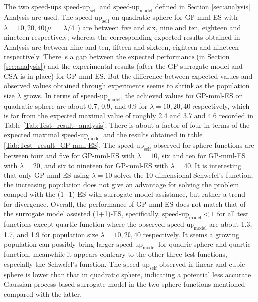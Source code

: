 The two speed-ups $\text{speed-up}_{\text{self}}$ and $\text{speed-up}_{\text{model}}$ defined in Section \ref{sec:analysis} Analysis are used.  The $\text{speed-up}_{\text{self}}$ on quadratic sphere for GP-mml-ES with $\lambda=10,20,40$($\mu = \lceil \lambda/4 \rceil $) are between five and six, nine and ten, eighteen and nineteen respectively; whereas the corresponding expected results obtained in Analysis are between nine and ten, fifteen and sixteen, eighteen and nineteen respectively. There is a gap between the expected performance (in Section \ref{sec:analysis}) and the experimental results (after the GP surrogate model and CSA is in place) for GP-mml-ES. But the difference between expected values and observed values obtained through experiments seems to shrink as the population size $\lambda$ grows. In terms of $\text{speed-up}_{\text{model}}$, the achieved values for GP-mml-ES on quadratic sphere are about 0.7, 0.9, and 0.9 for $\lambda=10,20,40$ respectively, which is far from the expected maximal value of roughly 2.4 and 3.7 and 4.6 recorded in Table \ref{Tab:Test_result_analysis}. There is about a factor of four in terms of the expected maximal $\text{speed-up}_{\text{model}}$ and the results obtained in table \ref{Tab:Test_result_GP-mml-ES}. The $\text{speed-up}_{\text{self}}$ observed for sphere functions are between four and five for GP-mml-ES with $\lambda=10$, six and ten for GP-mml-ES with $\lambda=20$, and six to nineteen for GP-mml-ES with $\lambda=40$. It is interesting that only GP-mml-ES using $\lambda=10$ solves the 10-dimensional Schwefel's function, the increasing population does not give an advantage for solving the problem comped with the (1+1)-ES with surrogate model assistance, but rather a trend for divergence. Overall, the performance of GP-mml-ES does not match that of the surrogate model assisted (1+1)-ES, specifically, $\text{speed-up}_{\text{model}}<1$ for all test functions except quartic function where the observed $\text{speed-up}_{\text{model}}$ are about 1.3, 1.7, and 1.9 for population size $\lambda=10,20,40$ respectively. It seems a growing population can possibly bring larger $\text{speed-up}_{\text{model}}$ for quadric sphere and quartic function, meanwhile it appears contrary to the other three test functions, especially the Schwefel's function. The $\text{speed-up}_{\text{self}}$ observed in linear and cubic sphere is lower than that in quadratic sphere, indicating a potential less accurate Gaussian process based surrogate model in the two sphere functions mentioned compared with the latter. 


